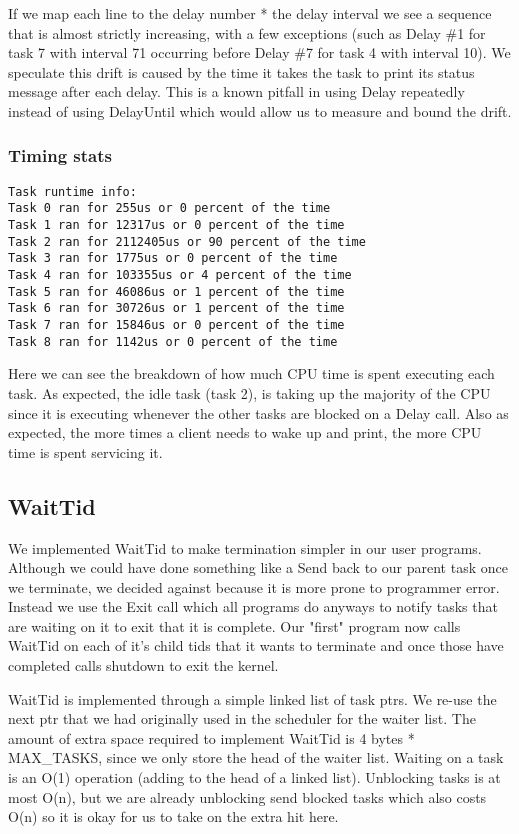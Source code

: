 \documentclass{article}
\begin{document}
If we map each line to the delay number * the delay interval we see a sequence that is almost strictly increasing, with a few exceptions (such as Delay \#1 for task 7 with interval 71 occurring before Delay \#7 for task 4 with interval 10).  We speculate this drift is caused by the time it takes the task to print its status message after each delay. This is a known pitfall in using Delay repeatedly instead of using DelayUntil which would allow us to measure and bound the drift. 

\subsubsection{Timing stats}
\begin{verbatim}
Task runtime info:
Task 0 ran for 255us or 0 percent of the time
Task 1 ran for 12317us or 0 percent of the time
Task 2 ran for 2112405us or 90 percent of the time
Task 3 ran for 1775us or 0 percent of the time
Task 4 ran for 103355us or 4 percent of the time
Task 5 ran for 46086us or 1 percent of the time
Task 6 ran for 30726us or 1 percent of the time
Task 7 ran for 15846us or 0 percent of the time
Task 8 ran for 1142us or 0 percent of the time
\end{verbatim}

Here we can see the breakdown of how much CPU time is spent executing each task. As expected, the idle task (task 2), is taking up the majority of the CPU since it is executing whenever the other tasks are blocked on a Delay call. Also as expected, the more times a client needs to wake up and print, the more CPU time is spent servicing it.

\subsection{WaitTid}

We implemented WaitTid to make termination simpler in our user programs. Although we could have done something like a Send back to our parent task once we terminate, we decided against because it is more prone to programmer error. Instead we use the Exit call which all programs do anyways to notify tasks that are waiting on it to exit that it is complete. Our "first" program now calls WaitTid on each of it's child tids that it wants to terminate and once those have completed calls shutdown to exit the kernel.

WaitTid is implemented through a simple linked list of task ptrs. We re-use the next ptr that we had originally used in the scheduler for the waiter list. The amount of extra space required to implement WaitTid is 4 bytes * MAX\_TASKS, since we only store the head of the waiter list. Waiting on a task is an O(1) operation (adding to the head of a linked list). Unblocking tasks is at most O(n), but we are already unblocking send blocked tasks which also costs O(n) so it is okay for us to take on the extra hit here.
\end{document}
